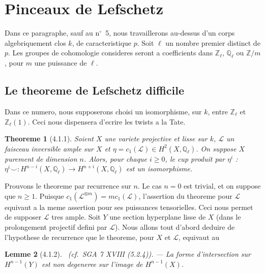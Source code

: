 \documentclass[12pt,a4paper]{article}
\theoremstyle{plain}
\newtheorem{theorem}{Theoreme}[section]
\newtheorem{lemma}[theorem]{Lemme}
\theoremstyle{definition}
\theoremstyle{remark}
\newcommand{\bbZ}{\mathbb{Z}}
\newcommand{\scrL}{\mathscr{L}}
\newcommand{\Zl}{\mathbb{Z}_\ell}
\newcommand{\Ql}{\mathbb{Q}_\ell}
\begin{document}
\setcounter{section}{3}

\section{Pinceaux de Lefschetz}

Dans ce paragraphe, sauf au n$^\circ$~5, nous travaillerons au-dessus d'un corps algebriquement clos $k$, de caracteristique $p$. Soit $\ell$ un nombre premier distinct de $p$. Les groupes de cohomologie consideres seront a coefficients dans $\Zl$, $\Ql$ ou $\bbZ/m$, pour $m$ une puissance de $\ell$.

\subsection{Le theoreme de Lefschetz difficile}

Dans ce numero, nous supposerons choisi un isomorphisme, sur $k$, entre $\Zl$ et $\Zl(1)$. Ceci nous dispensera d'ecrire les twists a la Tate.

\begin{theorem}[4.1.1]
Soient $X$ une variete projective et lisse sur $k$, $\scrL$ un faisceau inversible ample sur $X$ et $\eta = c_1(\scrL) \in H^2(X, \Ql)$. On suppose $X$ purement de dimension $n$. Alors, pour chaque $i \geq 0$, le cup produit par $\eta^i$ : $\eta^i \smile : H^{n-i}(X, \Ql) \to H^{n+i}(X, \Ql)$ est un isomorphisme.
\end{theorem}

Prouvons le theoreme par recurrence sur $n$. Le cas $n=0$ est trivial, et on suppose que $n \geq 1$. Puisque $c_1(\scrL^{\otimes m}) = m c_1(\scrL)$, l'assertion du theoreme pour $\scrL$ equivaut a la meme assertion pour ses puissances tensorielles. Ceci nous permet de supposer $\scrL$ tres ample. Soit $Y$ une section hyperplane lisse de $X$ (dans le prolongement projectif defini par $\scrL$). Nous allons tout d'abord deduire de l'hypothese de recurrence que le theoreme, pour $X$ et $\scrL$, equivaut au

\begin{lemma}[4.1.2]\ \textup{(cf.~SGA 7 XVIII (5.2.4)).} --- La forme d'intersection sur $H^{n-1}(Y)$ est non degeneree sur l'image de $H^{n-1}(X)$.
\end{lemma}
\end{document}
